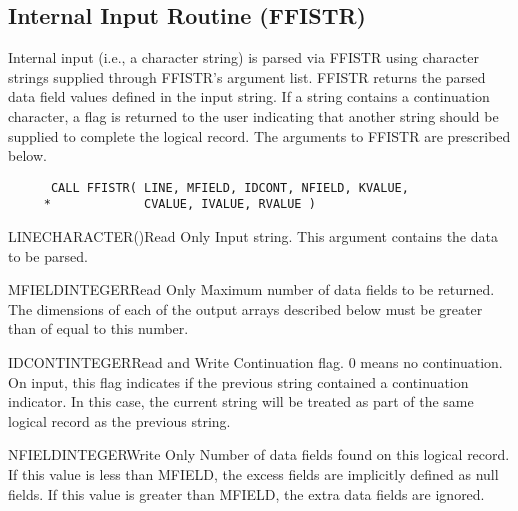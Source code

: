 \subsection{Internal Input Routine (FFISTR)}\label{sec:ffistr}

Internal input (i.e., a character string) is parsed via FFISTR using
character strings supplied through FFISTR's argument list.  FFISTR returns
the parsed data field values defined in the input string. If a string
contains a continuation character, a flag is returned to the user indicating
that another string should be supplied to complete the logical record.
The arguments to FFISTR are prescribed below.
\begin{verbatim}
      CALL FFISTR( LINE, MFIELD, IDCONT, NFIELD, KVALUE,
     *             CVALUE, IVALUE, RVALUE )
\end{verbatim}

\begin{argy}{LINE}{CHARACTER\last(\last)}{Read Only}
Input string. This argument contains the data to be parsed.
\end{argy}

\begin{argy}{MFIELD}{INTEGER}{Read Only}
Maximum number of data fields to be returned.
The dimensions of each of the output
arrays described below must be greater than of equal to this number.
\end{argy}

\begin{argy}{IDCONT}{INTEGER}{Read and Write}
Continuation flag. 0 means no continuation. On input, this flag indicates
if the previous string contained a continuation indicator. In this case, the
current string will be treated as part of the same logical record as the
previous string.
\end{argy}

\begin{argy}{NFIELD}{INTEGER}{Write Only}
Number of data fields found on this logical record.  If this value is less
than MFIELD, the excess fields are implicitly defined as null fields.  If
this value is greater than MFIELD, the extra data fields are ignored.
\end{argy}


